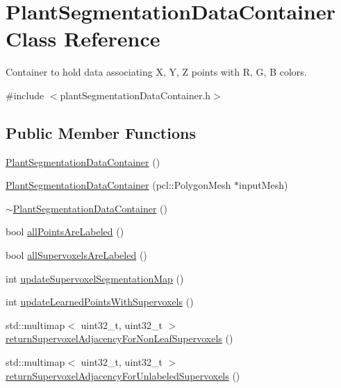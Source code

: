 \hypertarget{classPlantSegmentationDataContainer}{\section{Plant\-Segmentation\-Data\-Container Class Reference}
\label{classPlantSegmentationDataContainer}
}


Container to hold data associating X, Y, Z points with R, G, B colors.  




{\ttfamily \#include $<$plant\-Segmentation\-Data\-Container.\-h$>$}

\subsection*{Public Member Functions}
\begin{DoxyCompactItemize}
\item 
\hyperlink{classPlantSegmentationDataContainer_a0c472bd303d09113a018534a8cae09ef}{Plant\-Segmentation\-Data\-Container} ()
\item 
\hyperlink{classPlantSegmentationDataContainer_a0d8c9eb11c61c323293d478ef5675f3e}{Plant\-Segmentation\-Data\-Container} (pcl\-::\-Polygon\-Mesh $\ast$input\-Mesh)
\item 
\hyperlink{classPlantSegmentationDataContainer_acf75b9d4e3e118b8020bddd9fe897178}{$\sim$\-Plant\-Segmentation\-Data\-Container} ()
\item 
bool \hyperlink{classPlantSegmentationDataContainer_ac5083217e91a5aceb99a74e5d975579c}{all\-Points\-Are\-Labeled} ()
\item 
bool \hyperlink{classPlantSegmentationDataContainer_a565c2a3678d8bd19e0601422c00e1f6c}{all\-Supervoxels\-Are\-Labeled} ()
\item 
int \hyperlink{classPlantSegmentationDataContainer_a29624cc8d663a4b928328c70c19f2aa6}{update\-Supervoxel\-Segmentation\-Map} ()
\item 
int \hyperlink{classPlantSegmentationDataContainer_a02c1aa9311002fd1e52aa6467131e6a5}{update\-Learned\-Points\-With\-Supervoxels} ()
\item 
std\-::multimap$<$ uint32\-\_\-t, uint32\-\_\-t $>$ \hyperlink{classPlantSegmentationDataContainer_ad650087b1dbce31afbaafd91ff2d1a35}{return\-Supervoxel\-Adjacency\-For\-Non\-Leaf\-Supervoxels} ()
\item 
std\-::multimap$<$ uint32\-\_\-t, uint32\-\_\-t $>$ \hyperlink{classPlantSegmentationDataContainer_a032fa43ce457e01be971fa2bce20ff90}{return\-Supervoxel\-Adjacency\-For\-Unlabeled\-Supervoxels} ()
\end{DoxyCompactItemize}
